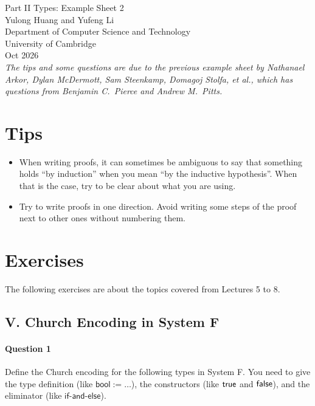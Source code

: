 \documentclass[11pt,a4paper,twoside]{article}
\begin{document}
\begin{center}
  {\Huge Part II Types: Example Sheet 2}\\
  \vspace{1.0em}
  {\large Yulong Huang and Yufeng Li}\\
  \vspace{0.5em}
  {\small Department of Computer Science and Technology \\ University
  of Cambridge \\ Oct 2026}\\
  \vspace{1.0em}
  \small{\textit{The tips and some questions are due to the previous
      example sheet by Nathanael Arkor, Dylan McDermott, Sam Steenkamp,
      Domagoj Stolfa, et al., which has questions from Benjamin C.~Pierce
  and Andrew M.~Pitts.}}
\end{center}

\section*{Tips}

\begin{itemize}

  \item When writing proofs, it can sometimes be ambiguous to say
    that something holds ``by induction'' when you mean ``by the
    inductive hypothesis''. When that is the case, try to be clear
    about what you are using.

  \item Try to write proofs in one direction. Avoid writing some
    steps of the proof next to other ones without numbering them.

\end{itemize}

\section*{Exercises}

The following exercises are about the topics covered from Lectures 5 to 8.

\subsection*{V. Church Encoding in System F}

\paragraph{Question 1} Define the Church encoding for the following
types in System F.
You need to give the type definition (like $\mathsf{bool} := \dots$),
the constructors (like $\mathsf{true}$ and $\mathsf{false}$),
and the eliminator (like $\mathsf{if\text{-}and\text{-}else}$).
\end{document}
